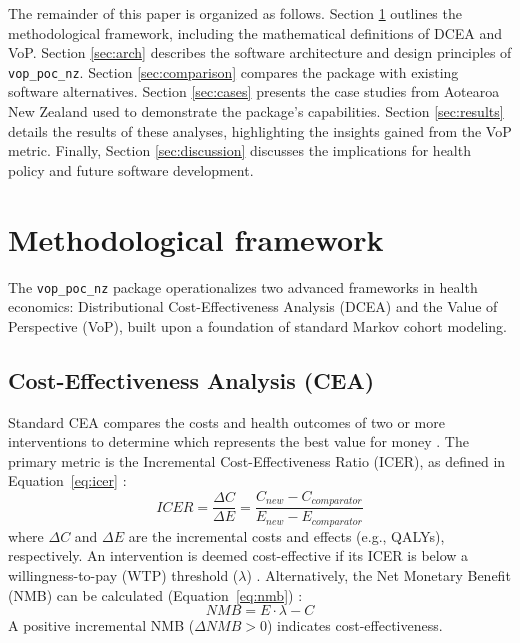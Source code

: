 \documentclass{article}
\newcommand{\pkg}[1]{\texttt{#1}}
\begin{document}
The remainder of this paper is organized as follows. Section \ref{sec:methods} outlines the methodological framework, including the mathematical definitions of DCEA and VoP. Section \ref{sec:arch} describes the software architecture and design principles of \pkg{vop\_poc\_nz}. Section \ref{sec:comparison} compares the package with existing software alternatives. Section \ref{sec:cases} presents the case studies from Aotearoa New Zealand used to demonstrate the package's capabilities. Section \ref{sec:results} details the results of these analyses, highlighting the insights gained from the VoP metric. Finally, Section \ref{sec:discussion} discusses the implications for health policy and future software development.

\section{Methodological framework} \label{sec:methods}

The \pkg{vop\_poc\_nz} package operationalizes two advanced frameworks in health economics: Distributional Cost-Effectiveness Analysis (DCEA) and the Value of Perspective (VoP), built upon a foundation of standard Markov cohort modeling.

\subsection{Cost-Effectiveness Analysis (CEA)}
Standard CEA compares the costs and health outcomes of two or more interventions to determine which represents the best value for money \citep{drummond2015}.
The primary metric is the Incremental Cost-Effectiveness Ratio (ICER), as defined in Equation~\ref{eq:icer} \citep{drummond2015}:
\begin{equation} \label{eq:icer}
ICER = \frac{\Delta C}{\Delta E} = \frac{C_{new} - C_{comparator}}{E_{new} - E_{comparator}}
\end{equation}
where $\Delta C$ and $\Delta E$ are the incremental costs and effects (e.g., QALYs), respectively.
An intervention is deemed cost-effective if its ICER is below a willingness-to-pay (WTP) threshold ($\lambda$) \citep{claxton2010}.
Alternatively, the Net Monetary Benefit (NMB) can be calculated (Equation~\ref{eq:nmb}) \citep{drummond2015}:
\begin{equation} \label{eq:nmb}
NMB = E \cdot \lambda - C
\end{equation}
A positive incremental NMB ($\Delta NMB > 0$) indicates cost-effectiveness.
\end{document}
